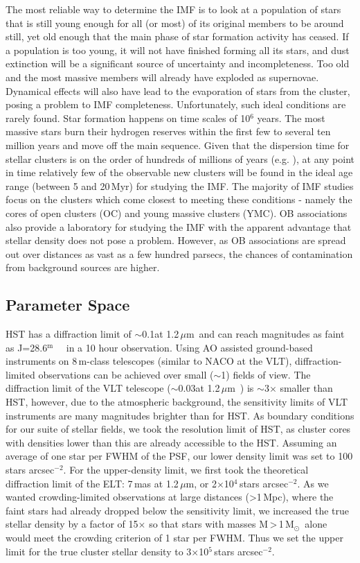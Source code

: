 \documentclass{aa}
\newcommand{\m}{$^\mathrm{m}$~}
\newcommand{\um}{$\mu$m~}
\newcommand{\ume}{$\mu$m}
\newcommand{\msun}{M$_\odot$~}
\newcommand{\s}{$\sim$}
\newcommand{\h}[1]{$^{#1}$}
\newcommand{\spae}{stars arcsec$^{-2}$}
\begin{document}
The most reliable way to determine the IMF is to look at a population of stars that is still young enough for all (or most) of its original members to be around still, yet old enough that the main phase of star formation activity has ceased.
If a population is too young, it will not have finished forming all its stars, and dust extinction will be a significant source of uncertainty and incompleteness.
  Too old and the most massive members will already have exploded as supernovae.
Dynamical effects will also have lead to the evaporation of stars from the cluster, posing a problem to IMF completeness.
Unfortunately, such ideal conditions are rarely found.
Star formation happens on time scales of 10\h6 years.
The most massive stars burn their hydrogen reserves within the first few to several ten million years and move off the main sequence.
Given that the dispersion time for stellar clusters is on the order of hundreds of millions of years (e.g. \citealt{Lada2003-ip}), at any point in time relatively few of the observable new clusters will be found in the ideal age range (between 5 and 20\,Myr) for studying the IMF\@.
The majority of IMF studies focus on the clusters which come closest to meeting these conditions - namely the cores of open clusters (OC) and young massive clusters (YMC).
OB associations also provide a laboratory for studying the IMF with the apparent advantage that stellar density does not pose a problem.
However, as OB associations are spread out over distances as vast as a few hundred parsecs, the chances of contamination from background sources are higher.


\subsection{Parameter Space}
\label{subsec:parameter_space}

HST has a diffraction limit of \s0.1\arcsec at 1.2\,\um and can reach magnitudes as faint as J=28.6\m~\citep{hst_wfc3} in a 10 hour observation.
Using AO assisted ground-based instruments on 8\,m-class telescopes (similar to NACO at the VLT), diffraction-limited observations can be achieved over small (\s1\arcmin) fields of view.
The diffraction limit of the VLT telescope (\s0.03\arcsec at 1.2\,\um) is \s3$\times$ smaller than HST, however, due to the atmospheric background, the sensitivity limits of VLT instruments are many magnitudes brighter than for HST\@.
As boundary conditions for our suite of stellar fields, we took the resolution limit of HST, as cluster cores with densities lower than this are already accessible to the HST\@.
Assuming an average of one star per FWHM of the PSF, our lower density limit was set to 100\,\spae.
For the upper-density limit, we first took the theoretical diffraction limit of the ELT: 7\,mas at 1.2\,\ume, or 2$\times$10\h4\,\spae.
As we wanted crowding-limited observations at large distances (\textgreater1\,Mpc), where the faint stars had already dropped below the sensitivity limit, we increased the true stellar density by a factor of 15$\times$ so that stars with masses M\,\textgreater\,1\,\msun alone would meet the crowding criterion of 1 star per FWHM\@.
Thus we set the upper limit for the true cluster stellar density to 3$\times$10\h5\,\spae.
\end{document}
